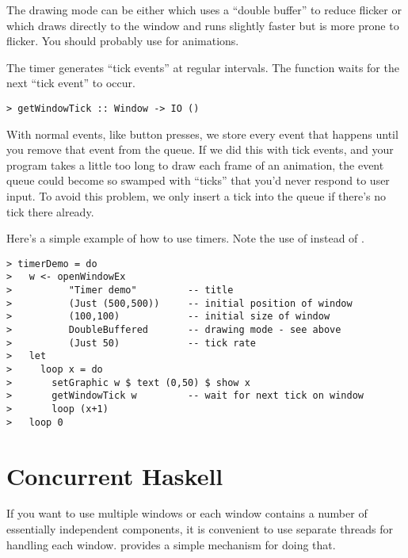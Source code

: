 The drawing mode can be either  which uses a
``double buffer'' to reduce flicker or  which draws
directly to the window and runs slightly faster but is more prone to
flicker.  You should probably use  for
animations.

The timer generates ``tick events'' at regular intervals.  The
function  waits for the next ``tick event'' to occur.

\begin{verbatim}
> getWindowTick :: Window -> IO ()
\end{verbatim}

\begin{aside}
With normal events, like button presses, we store every event that
happens until you remove that event from the queue.  If we did this
with tick events, and your program takes a little too long to draw
each frame of an animation, the event queue could become so swamped
with ``ticks'' that you'd never respond to user input.  To avoid this
problem, we only insert a tick into the queue if there's no tick there 
already.
\end{aside}

Here's a simple example of how to use timers.  Note the use of
 instead of .

\begin{verbatim}
> timerDemo = do
>   w <- openWindowEx 
>          "Timer demo"         -- title
>          (Just (500,500))     -- initial position of window
>          (100,100)            -- initial size of window
>          DoubleBuffered       -- drawing mode - see above
>          (Just 50)            -- tick rate
>   let
>     loop x = do
>       setGraphic w $ text (0,50) $ show x
>       getWindowTick w         -- wait for next tick on window
>       loop (x+1)
>   loop 0
\end{verbatim}



\section{Concurrent Haskell}\label{concurrency}

If you want to use multiple windows or each window contains a
number of essentially independent components, it is convenient
to use separate threads for handling each window.  \Hugs{}
provides a simple mechanism for doing that. 


